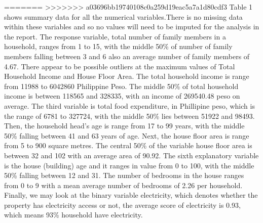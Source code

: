 \documentclass[
]{article}
\begin{document}
=======
>>>>>>> a03696bb19740108c0a259d19eac5a7a1d80cdf3
Table 1 shows summary data for all the numerical variables.There is no
missing data within these variables and so no values will need to be
imputed for the analysis in the report. The response variable, total
number of family members in a household, ranges from 1 to 15, with the
middle 50\% of number of family members falling between 3 and 6 also an
average number of family members of 4.67. There appear to be possible
outliers at the maximum values of Total Household Income and House Floor
Area. The total household income is range from 11988 to 6042860
Philippine Peso. The middle 50\% of total household income is between
118565 and 328335, with an income of 269540.48 peso on average. The
third variable is total food expenditure, in Phillipine peso, which is
the range of 6781 to 327724, with the middle 50\% lies between 51922 and
98493. Then, the household head's age is range from 17 to 99 years, with
the middle 50\% falling between 41 and 63 years of age. Next, the house
floor area is range from 5 to 900 square metres. The central 50\% of the
variable house floor area is between 32 and 102 with an average area of
90.92. The sixth explanatory variable is the house (building) age and it
ranges in value from 0 to 100, with the middle 50\% falling between 12
and 31. The number of bedrooms in the house ranges from 0 to 9 with a
mean average number of bedrooms of 2.26 per household. Finally, we may
look at the binary variable electricity, which denotes whether the
property has electricity access or not, the average score of electricity
is 0.93, which means 93\% household have electricity.

\begin{table}

\caption{\label{tab:numerical summaries}Summary statistics of numerical variables}
\centering
{}
\end{table}
\end{document}
